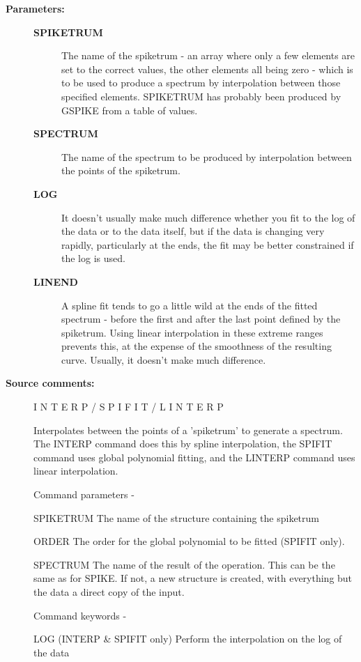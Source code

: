 \begin{description}
\begin{description}
\item [\textbf{Parameters:}]
\begin{description}
\item [\textbf{SPIKETRUM}]
 The name of the spiketrum - an array where
 only a few elements are set to the correct values, the
 other elements all being zero - which is to be used to
 produce a spectrum by interpolation between those specified
 elements.  SPIKETRUM has probably been produced by GSPIKE
 from a table of values.
\item [\textbf{SPECTRUM}]
 The name of the spectrum to be produced by
 interpolation between the points of the spiketrum.
\item [\textbf{LOG}]
 It doesn't usually make much difference whether you fit
 to the log of the data or to the data itself, but if the
 data is changing very rapidly, particularly at the ends,
 the fit may be better constrained if the log is used.
\item [\textbf{LINEND}]
 A spline fit tends to go a little wild at the ends of the
 fitted spectrum - before the first and after the last point
 defined by the spiketrum.  Using linear interpolation in
 these extreme ranges prevents this, at the expense of the
 smoothness of the resulting curve.  Usually, it doesn't
 make much difference.
\end{description}

\item [\textbf{Source comments:}]
\begin{terminalv}
 I N T E R P    /     S P I F I T    /   L I N T E R P

 Interpolates between the points of a 'spiketrum' to
 generate a spectrum.   The INTERP command does this by
 spline interpolation, the SPIFIT command uses global polynomial
 fitting, and the LINTERP command uses linear interpolation.

 Command parameters -

 SPIKETRUM  The name of the structure containing the spiketrum

 ORDER      The order for the global polynomial to be fitted
            (SPIFIT only).

 SPECTRUM   The name of the result of the operation.  This can
            be the same as for SPIKE.  If not, a new structure
            is created, with everything but the data a direct
            copy of the input.

 Command keywords  -

 LOG        (INTERP & SPIFIT only) Perform the interpolation on
            the log of the data


\end{terminalv}
\end{description}
\end{description}
